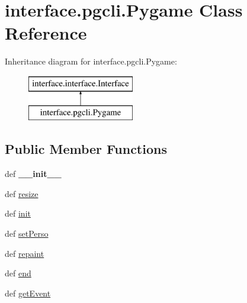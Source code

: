 \hypertarget{classinterface_1_1pgcli_1_1_pygame}{\section{interface.\-pgcli.\-Pygame \-Class \-Reference}
\label{classinterface_1_1pgcli_1_1_pygame}
}
\-Inheritance diagram for interface.\-pgcli.\-Pygame\-:\begin{figure}[H]
\begin{center}
\leavevmode
\includegraphics[height=2.000000cm]{classinterface_1_1pgcli_1_1_pygame}
\end{center}
\end{figure}
\subsection*{\-Public \-Member \-Functions}
\begin{DoxyCompactItemize}
\item 
\hypertarget{classinterface_1_1pgcli_1_1_pygame_a9804f9499be2ce194b677a765a309c1a}{def {\bfseries \-\_\-\-\_\-init\-\_\-\-\_\-}}\label{classinterface_1_1pgcli_1_1_pygame_a9804f9499be2ce194b677a765a309c1a}

\item 
def \hyperlink{classinterface_1_1pgcli_1_1_pygame_a38e19d00c66435e95013316bcc6c4759}{resize}
\item 
def \hyperlink{classinterface_1_1pgcli_1_1_pygame_a9db46e328c47fb0a1f1a54bfae15c206}{init}
\item 
def \hyperlink{classinterface_1_1pgcli_1_1_pygame_ad71c314cc94a53d5d467298bc174e98b}{set\-Perso}
\item 
def \hyperlink{classinterface_1_1pgcli_1_1_pygame_a573781e5e3e431fdaba5b36241e111aa}{repaint}
\item 
def \hyperlink{classinterface_1_1pgcli_1_1_pygame_a1324018c65524ca1864cdbd36d54414b}{end}
\item 
def \hyperlink{classinterface_1_1pgcli_1_1_pygame_ac3694884c2d8d6b8d14c69a86f405bd3}{get\-Event}
\end{DoxyCompactItemize}
